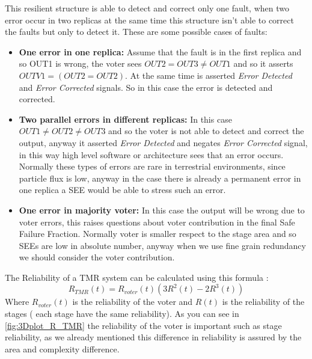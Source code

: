 {{{{        		This resilient structure is able to detect and correct only one fault, when two error occur in two replicas at the same time this structure isn't able to correct the faults but only to detect it.
        		These are some possible cases of faults:
        		\begin{itemize}
        		    \item \textbf{One error in one replica:} Assume that the fault is in the first replica and so OUT1 is wrong, the voter sees $OUT2=OUT3\neq OUT1$ and so it asserts $OUTV1 = (OUT2=OUT2)$. At the same time is asserted \textit{Error Detected} and \textit{Error Corrected} signals. So in this case the error is detected and corrected.
        		    \item \textbf{Two parallel errors in different replicas:} In this case $OUT1\neq OUT2 \neq OUT3$ and so the voter is not able to detect and correct the output, anyway it asserted \textit{Error Detected} and negates \textit{Error Corrected} signal, in this way high level software or architecture sees that an error occurs. Normally these types of errors are rare in terrestrial environments, since particle flux is low, anyway in the case there is already a permanent error in one replica a SEE would be able to stress such an error. 
        		    \item \textbf{One error in majority voter:} In this case the output will be wrong due to voter errors, this raises questions about voter contribution in the final Safe Failure Fraction. Normally voter is smaller respect to the stage area and so SEEs are low in absolute number, anyway when we use fine grain redundancy we should consider the voter contribution.
        		\end{itemize}
        		
        		The Reliability of a TMR system can be calculated using this formula :
        		\begin{equation}
        		    \label{eq:R_TMR}
        		     R_{TMR}(t) = R_{voter}(t)\left( 3 R^2(t) - 2R^3(t) \right)
        		\end{equation} 
        		Where $R_{voter}(t)$ is the reliability of the voter and $R(t)$ is the reliability of the stages ( each stage have the same reliability). As you can see in \ref{fig:3Dplot_R_TMR} the reliability of the voter is important such as stage reliability, as we already mentioned this difference in reliability is assured by the area and complexity difference. 
    		    
}}}}
